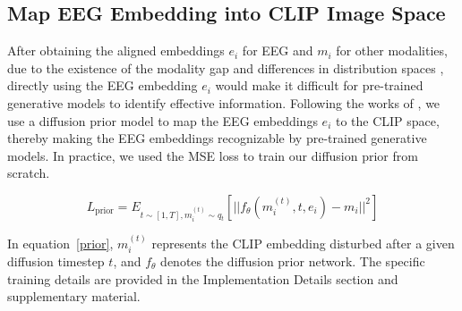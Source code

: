 \documentclass[letterpaper]{article} %
\begin{document}
\subsection{Map EEG Embedding into CLIP Image Space}

After obtaining the aligned embeddings $e_{i}$ for EEG and $m_{i}$ for other modalities, due to the existence of the modality gap  and differences in distribution spaces \cite{scotti2024reconstructing}, directly using the EEG embedding $e_{i}$ would make it difficult for pre-trained generative models to identify effective information. 
Following the works of \cite{scotti2024reconstructing, li2024visualdecodingreconstructioneeg, ramesh2022hierarchicaltextconditionalimagegeneration}, we use a diffusion prior model to map the EEG embeddings $e_{i}$ to the CLIP space, thereby making the EEG embeddings recognizable by pre-trained generative models. In practice, we used the MSE loss to train our diffusion prior from scratch.

\begin{equation}
L_{\text{prior}} = {E}_{t \sim [1, T], m_i^{(t)} \sim q_t} \left[ ||f_\theta(m_i^{(t)}, t, e_i) - m_i||^2 \right]
\label{prior}
\end{equation}

In equation~\eqref{prior}, $m_i^{(t)}$ represents the CLIP embedding disturbed after a given diffusion timestep $t$, and $f_{\theta}$ denotes the diffusion prior network. The specific training details are provided in the Implementation Details section and supplementary material.
\end{document}

